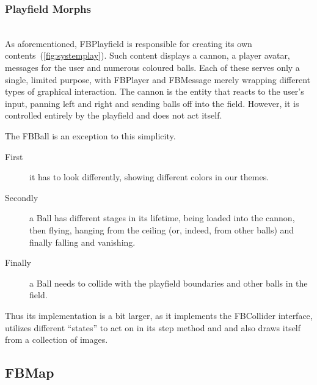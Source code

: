 \subsubsection{Playfield Morphs}~\\
As aforementioned, FBPlayfield is responsible for creating its own 
contents~(\ref{fig:systemplay}). Such content displays a cannon, a 
player avatar, messages for the user and numerous coloured balls. 
Each of these serves only a single, limited purpose, with FBPlayer 
and FBMessage merely wrapping different types of graphical interaction.
The cannon is the entity that reacts to the user's input, panning 
left and right and sending balls off into the field. However, it 
is controlled entirely by the playfield and does not act itself.

The FBBall is an exception to this simplicity. 
\begin{description}
  \item[First]
    	it has to look 
	differently, showing different colors in our themes. 
  \item[Secondly]
    	a Ball has different stages in its lifetime, being 
	loaded into the cannon, then flying, hanging from the 
	ceiling (or, indeed, from other balls) and finally falling 
	and vanishing.
  \item[Finally]
    	a Ball needs to collide with the playfield boundaries and 
	other balls in the field.
\end{description}
Thus its implementation is a bit larger, as it implements the FBCollider 
interface, utilizes different ``states'' to act on in its step method and 
and also draws itself from a collection of images.
%
\subsection{FBMap}
